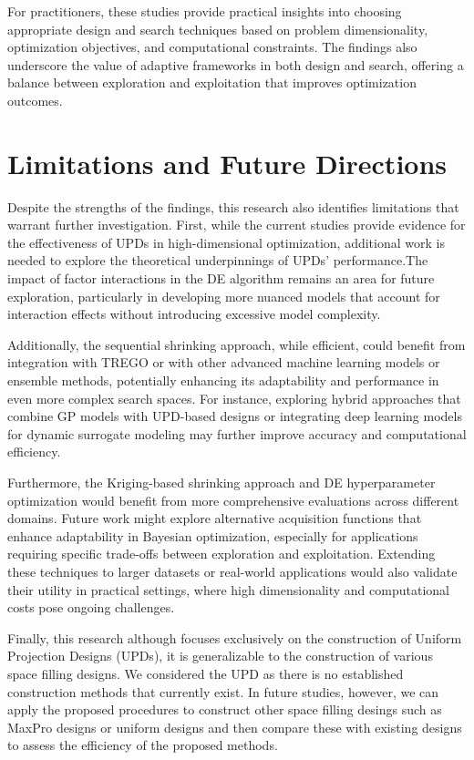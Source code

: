 For practitioners, these studies provide practical insights into choosing appropriate design and search techniques based on problem dimensionality, optimization objectives, and computational constraints. The findings also underscore the value of adaptive frameworks in both design and search, offering a balance between exploration and exploitation that improves optimization outcomes.

\section{Limitations and Future Directions}

Despite the strengths of the findings, this research also identifies limitations that warrant further investigation. First, while the current studies provide evidence for the effectiveness of UPDs in high-dimensional optimization, additional work is needed to explore the theoretical underpinnings of UPDs' performance.The impact of factor interactions in the DE algorithm remains an area for future exploration, particularly in developing more nuanced models that account for interaction effects without introducing excessive model complexity.

Additionally, the sequential shrinking approach, while efficient, could benefit from integration with TREGO or with other advanced machine learning models or ensemble methods, potentially enhancing its adaptability and performance in even more complex search spaces. For instance, exploring hybrid approaches that combine GP models with UPD-based designs or integrating deep learning models for dynamic surrogate modeling may further improve accuracy and computational efficiency.

Furthermore, the Kriging-based shrinking approach and DE hyperparameter optimization would benefit from more comprehensive evaluations across different domains. Future work might explore alternative acquisition functions that enhance adaptability in Bayesian optimization, especially for applications requiring specific trade-offs between exploration and exploitation. Extending these techniques to larger datasets or real-world applications would also validate their utility in practical settings, where high dimensionality and computational costs pose ongoing challenges.

Finally, this research although focuses exclusively on the construction of Uniform Projection Designs (UPDs), it is generalizable to the construction of various space filling designs.  We considered the UPD as there is no established construction methods that currently exist. In future studies, however, we can apply the proposed procedures to construct other space filling desings such as MaxPro designs or uniform designs and then compare these with existing designs to assess the efficiency of the proposed methods.

